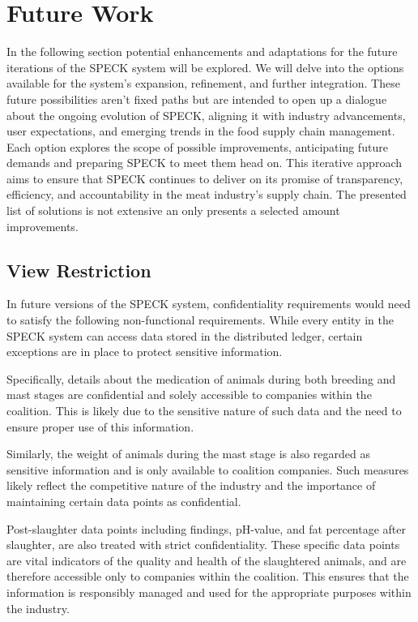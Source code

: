 \documentclass[oneside,a4paper,12pt, colorinlistoftodos]{article} %
\begin{document}
\section{Future Work}\label{se:future_work}
In the following section potential enhancements and adaptations for the future iterations of the SPECK system will be explored. We will delve into the options available for the system's expansion, refinement, and further integration. These future possibilities aren't fixed paths but are intended to open up a dialogue about the ongoing evolution of SPECK, aligning it with industry advancements, user expectations, and emerging trends in the food supply chain management. Each option explores the scope of possible improvements, anticipating future demands and preparing SPECK to meet them head on. This iterative approach aims to ensure that SPECK continues to deliver on its promise of transparency, efficiency, and accountability in the meat industry's supply chain. The presented list of solutions is not extensive an only presents a selected amount improvements.

\subsection{View Restriction}
In future versions of the SPECK system, confidentiality requirements would need to satisfy the following non-functional requirements.
While every entity in the SPECK system can access data stored in the distributed ledger, certain exceptions are in place to protect sensitive information.

Specifically, details about the medication of animals during both breeding and mast stages are confidential and solely accessible to companies within the coalition. This is likely due to the sensitive nature of such data and the need to ensure proper use of this information.

Similarly, the weight of animals during the mast stage is also regarded as sensitive information and is only available to coalition companies. Such measures likely reflect the competitive nature of the industry and the importance of maintaining certain data points as confidential.

Post-slaughter data points including findings, pH-value, and fat percentage after slaughter, are also treated with strict confidentiality. These specific data points are vital indicators of the quality and health of the slaughtered animals, and are therefore accessible only to companies within the coalition. This ensures that the information is responsibly managed and used for the appropriate purposes within the industry.
\end{document}
